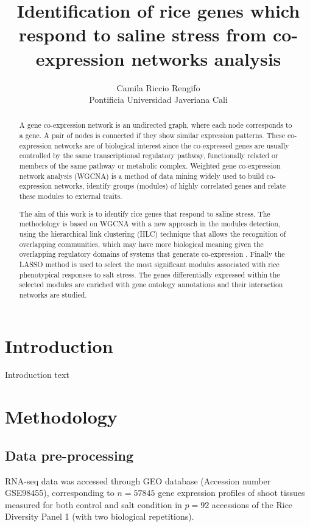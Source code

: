 \documentclass[journal, onecolumn]{IEEEtran}
\title{Identification of rice genes which respond to saline stress from co-expression networks analysis}
\author{Camila Riccio Rengifo\\
  \small Pontificia Universidad Javeriana Cali\\
}
\begin{document}
\maketitle

\begin{abstract}
A gene co-expression network is an undirected graph, where each node corresponds to a gene. A pair of nodes is connected if they show similar expression patterns. These co-expression networks are of biological interest since the co-expressed genes are usually controlled by the same transcriptional regulatory pathway, functionally related or members of the same pathway or metabolic complex. Weighted gene co-expression network analysis (WGCNA)  is a method of data mining widely used to build co-expression networks, identify groups (modules) of highly correlated genes and relate these modules to external traits.

The aim of this work is to identify rice genes that respond to saline stress. The methodology is based on WGCNA with a new approach in the modules detection, using  the hierarchical link clustering (HLC) technique that allows the recognition of overlapping communities, which may have more biological meaning given the overlapping regulatory domains of systems that generate co-expression \cite{gaiteri2014beyond}. Finally the LASSO method is used to select the most significant modules associated with rice phenotypical responses to salt stress. The genes differentially expressed within the selected modules are enriched with gene ontology annotations and their interaction networks are studied.
\end{abstract}


\section*{Introduction}
Introduction text

\section{Methodology}
\subsection{Data pre-processing} 
RNA-seq data was accessed through GEO database \cite{GEOAcces90:online} (Accession number GSE98455), corresponding to $n=57845$ gene expression profiles of shoot tissues measured for both control and salt condition in $p=92$ accessions of the Rice Diversity Panel 1 (with two biological repetitions). \\
\end{document}
